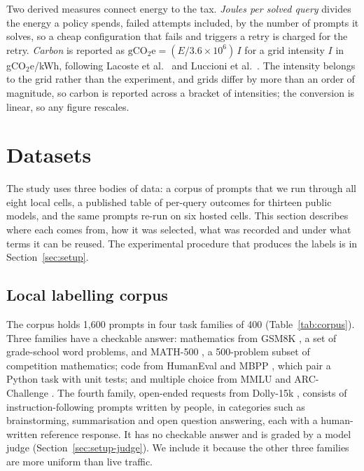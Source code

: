 \documentclass[final,5p,times,twocolumn]{elsarticle}
\theoremstyle{plain}
\begin{document}
Two derived measures connect energy to the tax. \emph{Joules per solved
query} divides the energy a policy spends, failed attempts included, by the
number of prompts it solves, so a cheap configuration that fails and triggers
a retry is charged for the retry. \emph{Carbon} is reported as
$\mathrm{gCO_2e} = (E/3.6 \times 10^{6})\,I$ for a grid intensity $I$ in
gCO$_2$e/kWh, following Lacoste et al.\ \cite{lacoste2019quantifying} and
Luccioni et al.\ \cite{luccioni2024powerhungry}. The intensity belongs to the
grid rather than the experiment, and grids differ by more than an order of
magnitude, so carbon is reported across a bracket of intensities; the
conversion is linear, so any figure rescales.

\section{Datasets}
\label{sec:datasets}

The study uses three bodies of data: a corpus of prompts that we run through
all eight local cells, a published table of per-query outcomes for thirteen
public models, and the same prompts re-run on six hosted cells. This section
describes where each comes from, how it was selected, what was recorded and
under what terms it can be reused. The experimental procedure that produces
the labels is in Section~\ref{sec:setup}.

\subsection{Local labelling corpus}
\label{sec:data-corpus}

The corpus holds 1{,}600 prompts in four task families of 400
(Table~\ref{tab:corpus}). Three families have a checkable answer: mathematics
from GSM8K \cite{cobbe2021gsm8k}, a set of grade-school word problems, and
MATH-500 \cite{hendrycks2021math,lightman2024verify}, a 500-problem subset of
competition mathematics; code from HumanEval \cite{chen2021humaneval} and
MBPP \cite{austin2021mbpp}, which pair a Python task with unit tests; and
multiple choice from MMLU \cite{hendrycks2021mmlu} and ARC-Challenge
\cite{clark2018arc}. The fourth family, open-ended requests from Dolly-15k
\cite{conover2023dolly}, consists of instruction-following prompts written by
people, in categories such as brainstorming, summarisation and open
question answering, each with a human-written reference response. It has no
checkable answer and is graded by a model judge
(Section~\ref{sec:setup-judge}). We include it because the other three
families are more uniform than live traffic.
\end{document}
